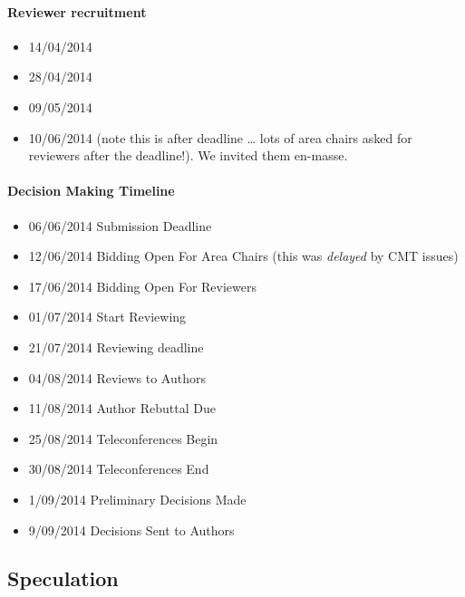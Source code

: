 \documentclass[a4paperpaper,]{article}
\providecommand{\tightlist}{%
  \setlength{\itemsep}{0pt}\setlength{\parskip}{0pt}}
\begin{document}
\paragraph{Reviewer recruitment}

\begin{itemize}
\tightlist
\item
  14/04/2014
\item
  28/04/2014
\item
  09/05/2014
\item
  10/06/2014 (note this is after deadline \ldots{} lots of area chairs
  asked for reviewers after the deadline!). We invited them en-masse.
\end{itemize}

\paragraph{Decision Making Timeline}

\begin{itemize}
\tightlist
\item
  06/06/2014 Submission Deadline
\item
  12/06/2014 Bidding Open For Area Chairs (this was \emph{delayed} by
  CMT issues)
\item
  17/06/2014 Bidding Open For Reviewers
\item
  01/07/2014 Start Reviewing
\item
  21/07/2014 Reviewing deadline
\item
  04/08/2014 Reviews to Authors
\item
  11/08/2014 Author Rebuttal Due
\item
  25/08/2014 Teleconferences Begin
\item
  30/08/2014 Teleconferences End
\item
  1/09/2014 Preliminary Decisions Made
\item
  9/09/2014 Decisions Sent to Authors
\end{itemize}

\hypertarget{speculation}{%
\subsection{Speculation}\label{speculation}}

\begin{flushright}
\end{flushright}
\end{document}

